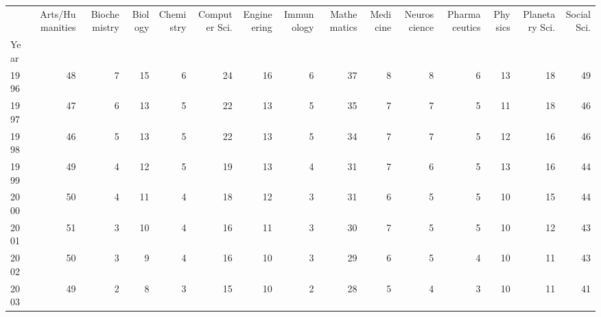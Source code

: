 \begin{tabular}{lrrrrrrrrrrrrrr}
\toprule
{} &  Arts/Humanities &  Biochemistry &  Biology &  Chemistry &  Computer Sci. &  Engineering &  Immunology &  Mathematics &  Medicine &  Neuroscience &  Pharmaceutics &  Physics &  Planetary Sci. &  Social Sci. \\
Year &                  &               &          &            &                &              &             &              &           &               &                &          &                 &              \\
\midrule
1996 &               48 &             7 &       15 &          6 &             24 &           16 &           6 &           37 &         8 &             8 &              6 &       13 &              18 &           49 \\
1997 &               47 &             6 &       13 &          5 &             22 &           13 &           5 &           35 &         7 &             7 &              5 &       11 &              18 &           46 \\
1998 &               46 &             5 &       13 &          5 &             22 &           13 &           5 &           34 &         7 &             7 &              5 &       12 &              16 &           46 \\
1999 &               49 &             4 &       12 &          5 &             19 &           13 &           4 &           31 &         7 &             6 &              5 &       13 &              16 &           44 \\
2000 &               50 &             4 &       11 &          4 &             18 &           12 &           3 &           31 &         6 &             5 &              5 &       10 &              15 &           44 \\
2001 &               51 &             3 &       10 &          4 &             16 &           11 &           3 &           30 &         7 &             5 &              5 &       10 &              12 &           43 \\
2002 &               50 &             3 &        9 &          4 &             16 &           10 &           3 &           29 &         6 &             5 &              4 &       10 &              11 &           43 \\
2003 &               49 &             2 &        8 &          3 &             15 &           10 &           2 &           28 &         5 &             4 &              3 &       10 &              11 &           41 \\

\end{tabular}
